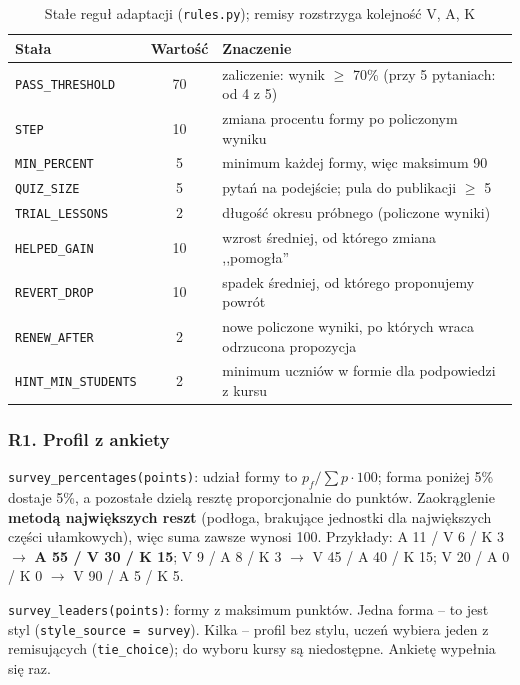 \begin{table}[H]
\centering
\small
\begin{tabular}{|l|c|p{8.2cm}|}
\hline
\textbf{Stała} & \textbf{Wartość} & \textbf{Znaczenie} \\ \hline
\texttt{PASS\_THRESHOLD} & 70 & zaliczenie: wynik $\geq$ 70\% (przy 5 pytaniach: od 4 z 5) \\ \hline
\texttt{STEP} & 10 & zmiana procentu formy po policzonym wyniku \\ \hline
\texttt{MIN\_PERCENT} & 5 & minimum każdej formy, więc maksimum 90 \\ \hline
\texttt{QUIZ\_SIZE} & 5 & pytań na podejście; pula do publikacji $\geq$ 5 \\ \hline
\texttt{TRIAL\_LESSONS} & 2 & długość okresu próbnego (policzone wyniki) \\ \hline
\texttt{HELPED\_GAIN} & 10 & wzrost średniej, od którego zmiana ,,pomogła'' \\ \hline
\texttt{REVERT\_DROP} & 10 & spadek średniej, od którego proponujemy powrót \\ \hline
\texttt{RENEW\_AFTER} & 2 & nowe policzone wyniki, po których wraca odrzucona propozycja \\ \hline
\texttt{HINT\_MIN\_STUDENTS} & 2 & minimum uczniów w formie dla podpowiedzi z kursu \\ \hline
\end{tabular}
\caption{Stałe reguł adaptacji (\texttt{rules.py}); remisy rozstrzyga kolejność V, A, K}
\end{table}

\subsubsection{R1. Profil z ankiety}
\texttt{survey\_percentages(points)}: udział formy to $p_f / \sum p \cdot 100$; forma poniżej 5\% dostaje 5\%, a pozostałe dzielą resztę proporcjonalnie do punktów. Zaokrąglenie \textbf{metodą największych reszt} (podłoga, brakujące jednostki dla największych części ułamkowych), więc suma zawsze wynosi 100. Przykłady: A 11 / V 6 / K 3 $\to$ \textbf{A 55 / V 30 / K 15}; V 9 / A 8 / K 3 $\to$ V 45 / A 40 / K 15; V 20 / A 0 / K 0 $\to$ V 90 / A 5 / K 5.

\texttt{survey\_leaders(points)}: formy z maksimum punktów. Jedna forma -- to jest styl (\texttt{style\_source = survey}). Kilka -- profil bez stylu, uczeń wybiera jeden z remisujących (\texttt{tie\_choice}); do wyboru kursy są niedostępne. Ankietę wypełnia się raz.

